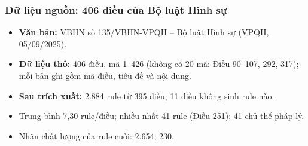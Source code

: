\begin{frame}
\frametitle{Dữ liệu nguồn: 406 điều của Bộ luật Hình sự}
\small
\begin{itemize}
  \item \textbf{Văn bản:} VBHN số 135/VBHN-VPQH -- Bộ luật Hình sự (VPQH, 05/09/2025).
  \item \textbf{Dữ liệu thô:} 406 điều, mã 1--426 (không có 20 mã: Điều 90--107, 292, 317);
        mỗi bản ghi gồm mã điều, tiêu đề và nội dung.
  \item \textbf{Sau trích xuất:} 2.884 rule từ 395 điều; 11 điều không sinh rule nào.
  \item Trung bình 7,30 rule/điều; nhiều nhất 41 rule (Điều 251); 41 chủ thể pháp lý.
  \item Nhãn chất lượng của rule cuối:  2.654;
         230.
\end{itemize}

\vspace{0.15cm}
\begin{center}
\hfill
{}\hfill
{}\hfill
{}
\end{center}

\vspace{0.05cm}
\end{frame}

